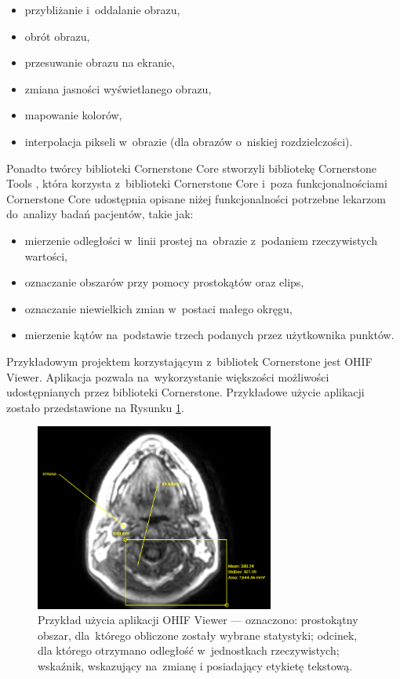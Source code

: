 \documentclass[a4paper,11pt,twoside,openright]{report}
\theoremstyle{definition}
\begin{document}
\begin{itemize}[noitemsep]
\item przybliżanie i~oddalanie obrazu,
\item obrót obrazu,
\item przesuwanie obrazu na ekranie,
\item zmiana jasności wyświetlanego obrazu,
\item mapowanie kolorów,
\item interpolacja pikseli w~obrazie (dla obrazów o~niskiej rozdzielczości).
\end{itemize}

Ponadto twórcy biblioteki Cornerstone Core stworzyli bibliotekę Cornerstone Tools \cite{Cornerstone Tools},
która korzysta z~biblioteki Cornerstone Core i~poza funkcjonalnościami
Cornerstone Core udostępnia opisane niżej funkcjonalności
potrzebne lekarzom do~analizy badań pacjentów, takie jak:

\begin{itemize}[noitemsep]
\item mierzenie odległości w~linii prostej na~obrazie z~podaniem rzeczywistych wartości,
\item oznaczanie obszarów przy pomocy prostokątów oraz elips,
\item oznaczanie niewielkich zmian w~postaci małego okręgu,
\item mierzenie kątów na~podstawie trzech podanych przez użytkownika punktów.
\end{itemize}

Przykładowym projektem korzystającym z~bibliotek Cornerstone jest OHIF Viewer.
Aplikacja pozwala na~wykorzystanie większości możliwości udostępnianych przez
biblioteki Cornerstone. Przykładowe użycie aplikacji zostało przedstawione na
Rysunku \ref{fig:OHIF-example}.

\begin{figure}[b!]
	\center
	\includegraphics[width=0.7\textwidth]{OHIF-example}
	\caption{Przykład użycia aplikacji OHIF Viewer --- oznaczono: prostokątny obszar,
	dla~którego obliczone zostały wybrane statystyki; odcinek, dla którego otrzymano
	odległość w~jednostkach rzeczywistych; wskaźnik, wskazujący na~zmianę i posiadający
	etykietę tekstową.}
    	\label{fig:OHIF-example}
\end{figure}
\end{document}
